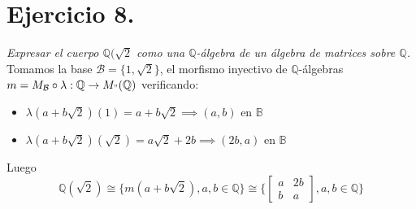 \section{Ejercicio 8.} \emph{Expresar el cuerpo \(\mathbb{Q}(\sqrt{2}\) como una
  \(\mathbb{Q}\)-álgebra de un álgebra de matrices sobre \(\mathbb{Q}\).}\\

Tomamos la base \(\mathcal{B} = \{1, \sqrt{2}\}\), el morfismo inyectivo de
\(\mathbb{Q}\)-álgebras \(m = M_\mathcal{B} \circ \lambda: \mathbb{Q} \to
M_"(\mathbb{Q}) \) verificando:

\begin{itemize}
\item \( \lambda(a+b\sqrt{2})(1) = a + b\sqrt{2} \implies (a ,b)\) en \(\mathbb{B}\)
\item \( \lambda(a+b\sqrt{2})(\sqrt{2}) = a\sqrt{2} + 2b \implies (2b ,a)\) en \(\mathbb{B}\)
\end{itemize}

Luego
\[
  \mathbb{Q}(\sqrt{2}) \cong \{m(a + b\sqrt{2}), a,b \in \mathbb{Q}\} \cong \Big\{
  \begin{bmatrix}
    a & 2b \\
    b & a
  \end{bmatrix},  a,b \in \mathbb{Q} \Big\}
\]
